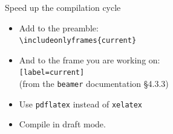 \begin{frame}{Speed up the compilation cycle}
  \begin{itemize}
    \item Add to the preamble:\\
      \texttt{\textbackslash includeonlyframes\{current\}}\\
    \item And to the frame you are working on:\\
      \texttt{[label=current]}\\
      (from the \texttt{beamer} documentation \S 4.3.3)
    \item Use \texttt{pdflatex} instead of \texttt{xelatex}
    \item  Compile in draft mode.
  \end{itemize}
\end{frame}
